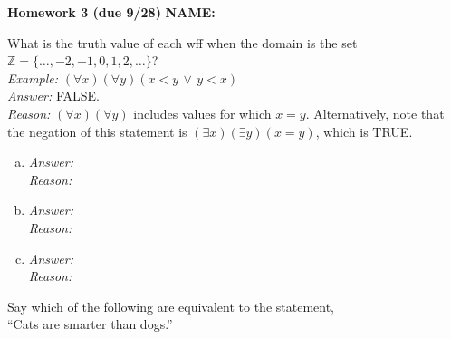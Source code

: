 \documentclass[addpoints,12pt]{exam}
\newif\ifanswers
\theoremstyle{remark}
\newcommand{\Z}{\ensuremath{\mathbb Z}}
\newcommand{\disj}{\ensuremath{\vee}}
\newcommand{\conj}{\ensuremath{\wedge}}
\newcommand{\onlyif}{\ensuremath{\rightarrow}}
\begin{document}
\hfill {\bf Homework 3 (due 9/28)} 
\hfill  \ifanswers {\bf ANSWERS} \else {\bf NAME:}\phantom{XXXXXXXXXXXXX} \fi 

  \renewcommand{\bigskip}{\vskip1cm}

\begin{questions} %

\pagestyle{foot}
  
  \question[3] %
  What is the truth value of each wff when the domain is the set
  $\Z = \{\dots, -2, -1, 0, 1, 2, \dots \}$?\\[8pt]
  {\it Example:} $(\forall x)(\forall y)(x < y \, \disj \, y< x)$\\[8pt]
  {\it Answer:} FALSE.\\[4pt] 
  {\it Reason:} $(\forall x)(\forall y)$ includes values for which $x=y$.
  Alternatively, note that the negation of this statement is 
  $(\exists x)(\exists y)(x=y)$, which is TRUE.
  \\
  \medskip
  \begin{enumerate}[(a)]
  \item 
    {\it Answer:}
    \\[8pt]
    {\it Reason:}
  \item
    \vskip15mm
    {\it Answer:}
    \\[8pt]
    {\it Reason:}
  \item
    \vskip15mm
    {\it Answer:}
    \\[8pt]
    {\it Reason:}
  \end{enumerate}

  \bigskip

  \question[3] %
  Say which of the following are equivalent to the statement, \\
    ``Cats are smarter than dogs.''    
  \begin{parts}

\end{parts}
\end{questions}
\end{document}
